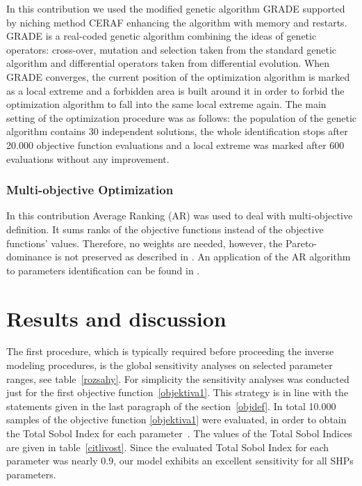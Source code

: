 \documentclass[review]{elsarticle}
\begin{document}
In this contribution we used the modified genetic algorithm GRADE \citep{grade,Kucerova:2007:PHD} supported by niching method CERAF \citep{Hrstka} enhancing the algorithm with
memory and restarts. GRADE is a real-coded genetic algorithm combining the ideas of genetic operators: cross-over, mutation and selection taken from the standard genetic algorithm and differential operators taken from differential evolution. When GRADE converges, the current position of the optimization algorithm is marked as a local extreme and a forbidden area is built around it in order to forbid the optimization algorithm to fall into the same local extreme again. The main setting of the optimization procedure was as follows: the population of the genetic algorithm contains 30 independent solutions, the whole identification stops after 20.000 objective function evaluations and a local extreme was marked after 600 evaluations without any improvement.


\subsubsection{Multi-objective Optimization}

 In this contribution Average Ranking (AR) \citep{Leps:2007} was used to deal with multi-objective definition. It sums ranks of the objective functions instead of the objective functions' values. Therefore, no weights are needed, however, the Pareto-dominance is not preserved as described in \cite{vitingerova:2010}. An application of the AR algorithm to parameters identification can be found in \cite{Kuraz:2010:JCAM}. 




\section{Results and discussion} %


The first procedure, which is typically required before proceeding the inverse modeling procedures, is the global sensitivity analyses on  selected parameter ranges, see table~\ref{rozsahy}. For simplicity the sensitivity analyses was conducted just for the first objective function~\eqref{objektiva1}. This strategy is in line with the statements given in the last paragraph of the section~\ref{objdef}. In total 10.000 samples of the objective function \eqref{objektiva1}  were evaluated, in order to obtain the  Total Sobol Index for each parameter~\citep{kniha-citlivost}. The values of the Total Sobol Indices are given in table~\ref{citlivost}. Since the evaluated Total Sobol Index for each parameter was nearly 0.9, our model exhibits an excellent sensitivity for all SHPs parameters. 
\end{document}
